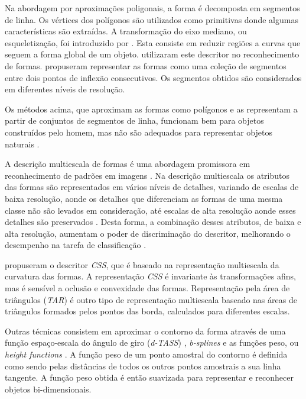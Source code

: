 Na abordagem por aproximações poligonais, a forma é decomposta em segmentos de linha. Os vértices dos polígonos são utilizados como primitivas donde algumas características são extraídas. A transformação do eixo mediano, ou esqueletização, foi introduzido por . Esta consiste em reduzir regiões a curvas que seguem a forma global de um objeto.  utilizaram este descritor no reconhecimento de formas.  propuseram representar as formas como uma coleção de segmentos entre dois pontos de inflexão consecutivos. Os segmentos obtidos são considerados em diferentes níveis de resolução. 

Os métodos acima, que aproximam as formas como polígonos e as representam a partir de conjuntos de segmentos de linha, funcionam bem para objetos construídos pelo homem, mas não são adequados para representar objetos naturais \cite{Zhang:2004}.

A descrição multiescala de formas é uma abordagem promissora em reconhecimento de padrões em imagens \cite{Direkoglu:2011}. Na descrição multiescala os atributos das formas são representados em vários níveis de detalhes, variando de escalas de baixa resolução, aonde os detalhes que diferenciam as formas de uma mesma classe não são levados em consideração, até escalas de alta resolução aonde esses detalhes são preservados \cite{Ullman:1996}. Desta forma, a combinação desses atributos, de baixa e alta resolução, aumentam o poder de discriminação do descritor, melhorando o desempenho na tarefa de classificação \cite{Direkoglu:2011}.

 propuseram o descritor \textit{CSS}, que é baseado na representação multiescala da curvatura das formas. A representação \textit{CSS} é invariante às transformações afins, mas é sensível a oclusão e convexidade das formas. Representação pela área de triângulos (\textit{TAR}) \cite{Alajlan20117} é outro tipo de representação multiescala baseado nas áreas de triângulos formados pelos pontos das borda, calculados para diferentes escalas. 

Outras técnicas consistem em aproximar o contorno da forma através de uma função espaço-escala do ângulo de giro (\textit{d-TASS}) \cite{4202050}, \textit{b-splines} \cite{1168520} e as funções peso, ou \textit{height functions} \cite{Wang2012134}. A função peso de um ponto amostral do contorno é definida como sendo pelas distâncias de todos os outros pontos amostrais a sua linha tangente. A função peso obtida é então suavizada para representar e reconhecer objetos bi-dimensionais.

